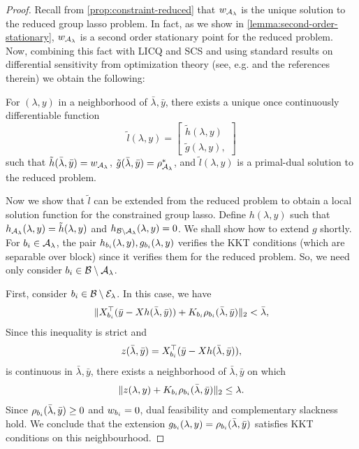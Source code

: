\localSolFn*
\begin{proof}
	Recall from \cref{prop:constraint-reduced} that \( w_{\mathcal{A}_{\lambda}} \) is the unique
	solution to the reduced group lasso problem.
	In fact, as we show in \cref{lemma:second-order-stationary}, \( w_{\mathcal{A}_{\lambda}} \) is
	a second order stationary point for the reduced problem.
	Now, combining this fact with LICQ and SCS
	and using standard results on differential sensitivity from optimization
	theory (see, e.g. \citet[Theorem 5.1]{fiacco1990sensitivity} and
	the references therein)
	we obtain the following:

	For \( (\lambda, y) \) in a neighborhood of \( \bar \lambda, \bar y \),
	there exists a unique once continuously differentiable function
	\[
		\tilde l(\lambda, y) =
		\begin{bmatrix}
			\tilde h(\lambda, y) \\
			\tilde g(\lambda, y),
		\end{bmatrix}
	\]
	such that \( \tilde h(\bar \lambda, \bar y) = w_{\mathcal{A}_{\lambda}} \),
	\( \tilde g(\bar \lambda, \bar y) = \rho^*_{\mathcal{A}_{\lambda}} \),
	and \( \tilde l(\lambda, y) \) is a primal-dual solution to the reduced
	problem.

	Now we show that \( \tilde l \) can be extended from the reduced problem
	to obtain a local solution function for the constrained group lasso.
	Define \( h(\lambda, y) \) such that
	\( h_{\mathcal{A}_{\lambda}}(\lambda, y) = \tilde h(\lambda, y) \)
	and \( h_{\mathcal{B} \setminus {\mathcal{A}_{\lambda}}}(\lambda, y) = 0 \).
	We shall show how to extend \( g \) shortly.
	For \( {b_i} \in {\mathcal{A}_{\lambda}} \), the pair
	\( h_{{b_i}}(\lambda, y), g_{b_i}(\lambda, y) \)
	verifies the KKT conditions (which are separable over block)
	since it verifies them for the reduced problem.
	So, we need only consider \( {b_i} \in \mathcal{B} \setminus {\mathcal{A}_{\lambda}} \).

	First, consider \( {b_i} \in \mathcal{B} \setminus {\mathcal{E}_{\lambda}} \).
	In this case, we have
	\[
		\|X_{b_i}^\top (\bar y - X h(\bar \lambda, \bar y)) + K_{{b_i}} \rho_{{b_i}}(\bar \lambda, \bar y)\|_2
		< \bar \lambda,
	\]
	Since this inequality is strict and
	\[
		z(\bar\lambda, \bar y) = X_{b_i}^\top (\bar y - X h(\bar \lambda, \bar y)),
	\]
	is continuous in \( \bar \lambda, \bar y \),
	there exists a neighborhood of \( \bar \lambda, \bar y \)
	on which
	\[
		\|z(\lambda, y) + K_{{b_i}} \rho_{{b_i}}(\bar \lambda, \bar y)\|_2
		\leq \lambda.
	\]
	Since \( \rho_{{b_i}}(\bar \lambda, \bar y) \geq 0 \) and \( w_{b_i} = 0 \),
	dual feasibility and complementary slackness hold.
	We conclude that the extension
	\( g_{b_i}(\lambda, y) = \rho_{{b_i}}(\bar \lambda, \bar y) \)
	satisfies KKT conditions on this neighbourhood.


\end{proof}
